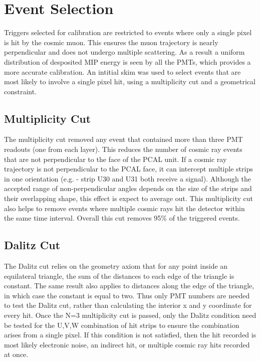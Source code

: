 \section{Event Selection}

Triggers selected for calibration are restricted to events where only a single pixel is hit by the cosmic muon.  This ensures the muon trajectory is nearly perpendicular and does not undergo multiple scattering.  As a result a uniform distribution of desposited MIP energy is seen by all the PMTs, which provides a more accurate calibration. An intitial skim was used to select events that are most likely to involve a single pixel hit, using a multiplicity cut and a geometrical constraint.

\FloatBarrier
\subsection{Multiplicity Cut}
The multiplicity cut removed any event that contained more than three PMT readouts (one from each layer). This reduces the number of cosmic ray events that are not perpendicular to the face of the PCAL unit.  If a cosmic ray trajectory is not perpendicular to the PCAL face, it can intercept multiple strips in one orientation (e.g. - strip U30 and U31 both receive a signal). Although the accepted range of non-perpendicular angles depends on the size of the strips and their overlapping shape, this effect is expect to average out.  This multiplicity cut also helps to remove events where multiple cosmic rays hit the detector within the same time interval.  Overall this cut removes 95\% of the triggered events. 

\FloatBarrier
\subsection{Dalitz Cut} 
The Dalitz cut relies on the geometry axiom that for any point inside an equilateral triangle, the sum of the distances to each edge of the triangle is constant.  The same result also applies to distances along the edge of the triangle, in which case the constant is equal to two.  Thus only PMT numbers are needed to test the Dalitz cut, rather than calculating the interior x and y coordinate for every hit.  Once the N=3 multiplicity cut is passed, only the Dalitz condition need be tested for the U,V,W combination of hit strips to ensure the combination arises from a single pixel. If this condition is not satisfied, then the hit recorded is most likely electronic noise, an indirect hit, or multiple cosmic ray hits recorded at once.

